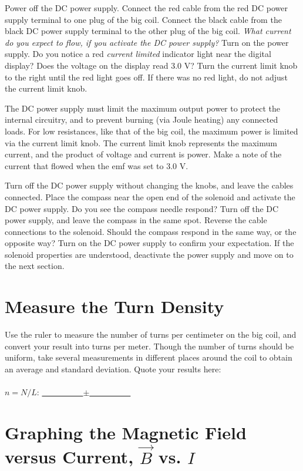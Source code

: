 \documentclass[12pt]{article}
\begin{document}
Power off the DC power supply.  Connect the red cable from the red DC power supply terminal to one plug of the big coil.  Connect the black cable from the black DC power supply terminal to the other plug of the big coil.  \textit{What current do you expect to flow, if you activate the DC power supply?} Turn on the power supply.  Do you notice a red \textit{current limited} indicator light near the digital display?  Does the voltage on the display read 3.0 V?  Turn the current limit knob to the right until the red light goes off.  If there was no red light, do not adjust the current limit knob.  

The DC power supply must limit the maximum output power to protect the internal circuitry, and to prevent burning (via Joule heating) any connected loads.  For low resistances, like that of the big coil, the maximum power is limited via the current limit knob.  The current limit knob represents the maximum current, and the product of voltage and current is power.  Make a note of the current that flowed when the emf was set to 3.0 V.

Turn off the DC power supply without changing the knobs, and leave the cables connected.  Place the compass near the open end of the solenoid and activate the DC power supply.  Do you see the compass needle respond?  Turn off the DC power supply, and leave the compass in the same spot.  Reverse the cable connections to the solenoid.  Should the compass respond in the same way, or the opposite way?  Turn on the DC power supply to confirm your expectation.  If the solenoid properties are understood, deactivate the power supply and move on to the next section.

\section{Measure the Turn Density}

Use the ruler to measure the number of turns per centimeter on the big coil, and convert your result into turns per meter.  Though the number of turns should be uniform, take several measurements in different places around the coil to obtain an average and standard deviation.  Quote your results here: \\ \\

$n = N/L$: \underline{~~~~~~~~~~}$\pm$\underline{~~~~~~~~~~}

\section{Graphing the Magnetic Field versus Current, $\vec{B}$ vs. $I$}
\label{sec:graph}
\end{document}
